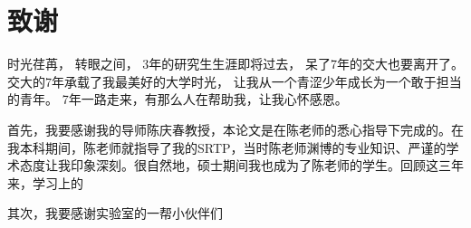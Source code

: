 \chapter*{致\qquad{}谢}
时光荏苒，
转眼之间，
3年的研究生生涯即将过去，
呆了7年的交大也要离开了。
交大的7年承载了我最美好的大学时光，
让我从一个青涩少年成长为一个敢于担当的青年。
7年一路走来，有那么人在帮助我，让我心怀感恩。
\par
首先，我要感谢我的导师陈庆春教授，本论文是在陈老师的悉心指导下完成的。在我本科期间，陈老师就指导了我的SRTP，当时陈老师渊博的专业知识、严谨的学术态度让我印象深刻。很自然地，硕士期间我也成为了陈老师的学生。回顾这三年来，学习上的
\par
其次，我要感谢实验室的一帮小伙伴们